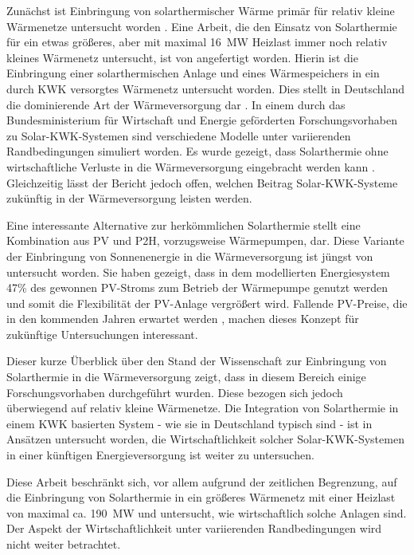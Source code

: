 Zunächst ist Einbringung von solarthermischer Wärme primär für relativ kleine Wärmenetze untersucht worden \cite{CARPANETO2015714, PAKERE2018549, JOLY2017865}. Eine Arbeit, die den Einsatz von Solarthermie für ein etwas größeres, aber mit maximal 16~MW Heizlast immer noch relativ kleines Wärmenetz untersucht, ist von \citet{WINTERSCHEID2017579} angefertigt worden. Hierin ist die Einbringung einer solarthermischen Anlage und eines Wärmespeichers in ein durch \ac{KWK} versorgtes Wärmenetz untersucht worden. Dies stellt in Deutschland die dominierende Art der Wärmeversorgung dar \cite{WINTERSCHEID2017579}. In einem durch das Bundesministerium für Wirtschaft und Energie geförderten Forschungsvorhaben zu Solar-\ac{KWK}-Systemen sind verschiedene Modelle unter variierenden Randbedingungen simuliert worden. Es wurde gezeigt, dass Solarthermie ohne wirtschaftliche Verluste in die Wärmeversorgung eingebracht werden kann \cite{berberich2015solar}. Gleichzeitig lässt der Bericht jedoch offen, welchen Beitrag Solar-\ac{KWK}-Systeme zukünftig in der Wärmeversorgung leisten werden.

Eine interessante Alternative zur herkömmlichen Solarthermie stellt eine Kombination aus \ac{PV} und \ac{P2H}, vorzugsweise Wärmepumpen, dar. Diese Variante der Einbringung von Sonnenenergie in die Wärmeversorgung ist jüngst von \citet{GRAVELSINS2019} untersucht worden. Sie haben gezeigt, dass in dem modellierten Energiesystem 47\% des gewonnen \ac{PV}-Stroms zum Betrieb der Wärmepumpe genutzt werden und somit die Flexibilität der \ac{PV}-Anlage vergrößert wird. Fallende \ac{PV}-Preise, die in den kommenden Jahren erwartet werden \cite{Vartiainen2019}, machen dieses Konzept für zukünftige Untersuchungen interessant.

Dieser kurze Überblick über den Stand der Wissenschaft zur Einbringung von Solarthermie in die Wärmeversorgung zeigt, dass in diesem Bereich einige Forschungsvorhaben durchgeführt wurden. Diese bezogen sich jedoch überwiegend auf relativ kleine Wärmenetze. Die Integration von Solarthermie in einem \ac{KWK} basierten System - wie sie in Deutschland typisch sind - ist in Ansätzen untersucht worden, die Wirtschaftlichkeit solcher Solar-\ac{KWK}-Systemen in einer künftigen Energieversorgung ist weiter zu untersuchen.

Diese Arbeit beschränkt sich, vor allem aufgrund der zeitlichen Begrenzung, auf die Einbringung von Solarthermie in ein größeres Wärmenetz mit einer Heizlast von maximal ca. 190~MW und untersucht, wie wirtschaftlich solche Anlagen sind. Der Aspekt der Wirtschaftlichkeit unter variierenden Randbedingungen wird nicht weiter betrachtet.

